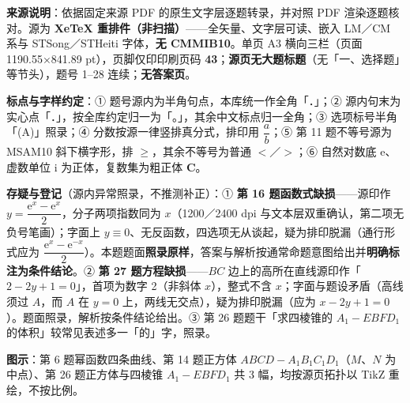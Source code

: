 


\begin{gktip}
\textbf{来源说明}：依据固定来源 PDF 的原生文字层逐题转录，并对照 PDF 渲染逐题核对。源为 \textbf{XeTeX 重排件（非扫描）}——全矢量、文字层可读、嵌入 LM／CM 系与 STSong／STHeiti 字体，\textbf{无 CMMIB10}。单页 A3 横向三栏（页面 1190.55×841.89 pt），页脚仅印印刷页码 \textbf{43}；\textbf{源页无大题标题}（无「一、选择题」等节头），题号 1–28 连续；\textbf{无答案页}。

\textbf{标点与字样约定}：① 题号源内为半角句点，本库统一作全角「．」；② 源内句末为实心点「．」，按全库约定归一为「。」，其余中文标点归一全角；③ 选项标号半角「(A)」照录；④ 分数按源一律竖排真分式，排印用 \(\dfrac{a}{b}\)；⑤ 第 11 题不等号源为 MSAM10 斜下横字形，排 \(\geqslant\)，其余不等号为普通 \(<\)／\(>\)；⑥ 自然对数底 \(\mathrm{e}\)、虚数单位 \(\mathrm{i}\) 为正体，复数集为粗正体 \(\mathbf{C}\)。

\textbf{存疑与登记}（源内异常照录，不推测补正）：① \textbf{第 16 题函数式缺损}——源印作 \(y=\dfrac{\mathrm{e}^{x}-\mathrm{e}^{x}}{2}\)，分子两项指数同为 \(x\)（1200／2400 dpi 与文本层双重确认，第二项无负号笔画）；字面上 \(y\equiv0\)、无反函数，四选项无从谈起，疑为排印脱漏（通行形式应为 \(\dfrac{\mathrm{e}^{x}-\mathrm{e}^{-x}}{2}\)）。本题题面\textbf{照录原样}，答案与解析按通常命题意图给出并\textbf{明确标注为条件结论}。② \textbf{第 27 题方程缺损}——\(BC\) 边上的高所在直线源印作「\(2-2y+1=0\)」，首项为数字 2（非斜体 \(x\)），整式不含 \(x\)；字面与题设矛盾（高线须过 \(A\)，而 \(A\) 在 \(y=0\) 上，两线无交点），疑为排印脱漏（应为 \(x-2y+1=0\)）。题面照录，解析按条件结论给出。③ 第 26 题题干「求四棱锥的 \(A_1-EBFD_1\) 的体积」较常见表述多一「的」字，照录。

\textbf{图示}：第 6 题幂函数四条曲线、第 14 题正方体 \(ABCD-A_1B_1C_1D_1\)（\(M\)、\(N\) 为中点）、第 26 题正方体与四棱锥 \(A_1-EBFD_1\) 共 3 幅，均按源页拓扑以 TikZ 重绘，不按比例。
\end{gktip}

